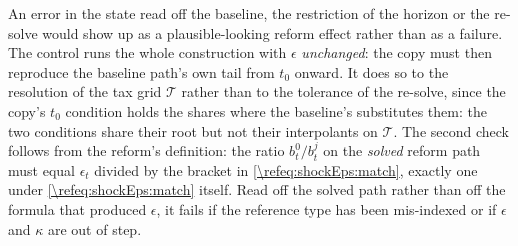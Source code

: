 An error in the state read off the baseline, the restriction of the horizon or the re-solve would show up as a plausible-looking reform effect rather than as a failure. The control runs the whole construction with $\epsilon$ \emph{unchanged}: the copy must then reproduce the baseline path's own tail from $t_0$ onward. It does so to the resolution of the tax grid $\mathcal{T}$ rather than to the tolerance of the re-solve, since the copy's $t_0$ condition holds the shares where the baseline's substitutes them: the two conditions share their root but not their interpolants on $\mathcal{T}$. The second check follows from the reform's definition: the ratio $b_t^0/b_t^j$ on the \emph{solved} reform path must equal $\epsilon_t$ divided by the bracket in \eqref{\refeq:shockEps:match}, exactly one under \eqref{\refeq:shockEps:match} itself. Read off the solved path rather than off the formula that produced $\epsilon$, it fails if the reference type has been mis-indexed or if $\epsilon$ and $\kappa$ are out of step.
